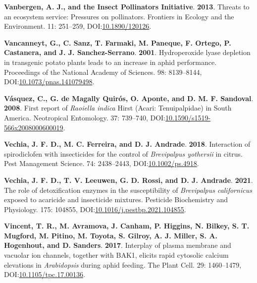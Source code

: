 \documentclass[12pt,final,CPage]{ufthesis}
\newlength{\cslhangindent}
\newenvironment{CSLReferences}[2] %
{%
	\setlength{\parindent}{0pt}
	\ifodd #1 \everypar{\setlength{\hangindent}{\cslhangindent}}\ignorespaces\fi
	\ifnum #2 > 0
	\setlength{\parskip}{#2\baselineskip}
	\fi
}%
{}
\begin{document}
{\begin{CSLReferences}{1}{0}
  \leavevmode{}%
  \textbf{Vanbergen, A. J., and the Insect Pollinators Initiative}. \textbf{2013}. Threats to an ecosystem service: Pressures on pollinators. Frontiers in Ecology and the Environment. 11: 251--259, DOI:\href{https://doi.org/10.1890/120126}{10.1890/120126}.

  \leavevmode{}%
  \textbf{Vancanneyt, G., C. Sanz, T. Farmaki, M. Paneque, F. Ortego, P. Castanera, and J. J. Sanchez-Serrano}. \textbf{2001}. Hydroperoxide lyase depletion in transgenic potato plants leads to an increase in aphid performance. Proceedings of the National Academy of Sciences. 98: 8139--8144, DOI:\href{https://doi.org/10.1073/pnas.141079498}{10.1073/pnas.141079498}.

  \leavevmode{}%
  \textbf{Vásquez, C., G. de Magally Quirós, O. Aponte, and D. M. F. Sandoval}. \textbf{2008}. First report of {\emph{Raoiella indica}} {Hirst} ({Acari}: {Tenuipalpidae}) in {South} {America}. Neotropical Entomology. 37: 739--740, DOI:\href{https://doi.org/10.1590/s1519-566x2008000600019}{10.1590/s1519-566x2008000600019}.

  \leavevmode{}%
  \textbf{Vechia, J. F. D., M. C. Ferreira, and D. J. Andrade}. \textbf{2018}. Interaction of spirodiclofen with insecticides for the control of {\emph{Brevipalpus yothersii}} in citrus. Pest Management Science. 74: 2438--2443, DOI:\href{https://doi.org/10.1002/ps.4918}{10.1002/ps.4918}.

  \leavevmode{}%
  \textbf{Vechia, J. F. D., T. V. Leeuwen, G. D. Rossi, and D. J. Andrade}. \textbf{2021}. The role of detoxification enzymes in the susceptibility of {\emph{Brevipalpus californicus}} exposed to acaricide and insecticide mixtures. Pesticide Biochemistry and Physiology. 175: 104855, DOI:\href{https://doi.org/10.1016/j.pestbp.2021.104855}{10.1016/j.pestbp.2021.104855}.

  \leavevmode{}%
  \textbf{Vincent, T. R., M. Avramova, J. Canham, P. Higgins, N. Bilkey, S. T. Mugford, M. Pitino, M. Toyota, S. Gilroy, A. J. Miller, S. A. Hogenhout, and D. Sanders}. \textbf{2017}. Interplay of plasma membrane and vacuolar ion channels, together with {BAK}1, elicits rapid cytosolic calcium elevations in {\emph{Arabidopsis}} during aphid feeding. The Plant Cell. 29: 1460--1479, DOI:\href{https://doi.org/10.1105/tpc.17.00136}{10.1105/tpc.17.00136}.


\end{CSLReferences}}
\end{document}
